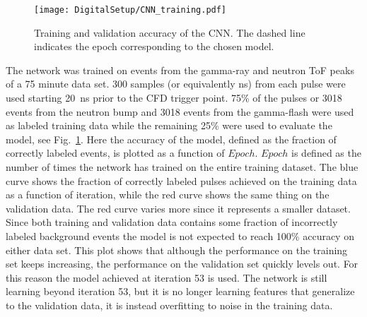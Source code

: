 \documentclass[main.tex]{subfiles}
\begin{document}
\begin{figure}[ht!]
    \centering
        \texttt{[image: DigitalSetup/CNN\_training.pdf]}
        \caption[Training and validation accuracy of the CNN.]{Training and validation accuracy of the CNN. The dashed line indicates the epoch corresponding to the chosen model.}
    \label{fig:CNN_training} 
\end{figure}

The network was trained on events from the gamma-ray and neutron ToF peaks of a 75 minute data set. 300 samples (or equivalently ns) from each pulse were used starting \SI{20}{ns} prior to the CFD trigger point. 75\% of the pulses or 3018 events from the neutron bump and 3018 events from the gamma-flash were used as labeled training data while the remaining 25\% were used to evaluate the model, see Fig.~\ref{fig:CNN_training}. Here the accuracy of the model, defined as the fraction of correctly labeled events, is plotted as a function of $Epoch$. $Epoch$ is defined as the number of times the network has trained on the entire training dataset. The blue curve shows the fraction of correctly labeled pulses achieved on the training data as a function of iteration, while the red curve shows the same thing on the validation data. The red curve varies more since it represents a smaller dataset. Since both training and validation data contains some fraction of incorrectly labeled background events the model is not expected to reach 100\% accuracy on either data set. This plot shows that although the performance on the training set keeps increasing, the performance on the validation set quickly levels out. For this reason the model achieved at iteration 53 is used. The network is still learning beyond iteration 53, but it is no longer learning features that generalize to the validation data, it is instead overfitting to noise in the training data.
\end{document}
